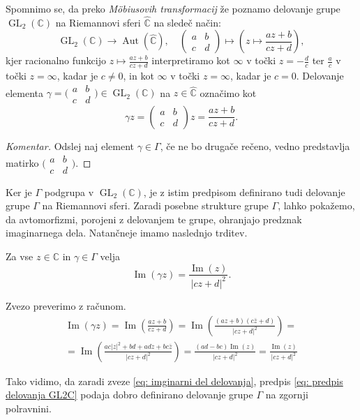 \documentclass[mat1]{fmfdelo}
\numberwithin{equation}{section}
\newcommand{\C}{\mathbb C}
\newcommand{\RS}{\widehat{\C}}
\newcommand{\SL}{\Gamma}
\newcommand{\abcd}{\big(\begin{smallmatrix} a & b\\c & d \end{smallmatrix}\big)}
\newcommand{\pabcd}{\begin{pmatrix} a & b \\ c & d \end{pmatrix}}
\newcommand{\abs}[1]{\left\lvert #1 \right\rvert}
\renewcommand\Im{\operatorname{Im}}%
\DeclareMathOperator{\GL}{GL}
\DeclareMathOperator{\Aut}{Aut}
\theoremstyle{definition}
\newenvironment{komentar}[1][Komentar]{\begin{proof}[#1]\let\qed\relax}{\end{proof}}
\begin{document}
Spomnimo se, da preko \emph{Möbiusovih transformacij} že poznamo delovanje grupe $\GL_2(\C)$ na Riemannovi sferi $\RS$ na sledeč način:
\begin{equation}
    \label{eq: delovanje GL2C na CP1}
    \GL_2(\C) \to \Aut(\RS), \quad \pabcd \mapsto \left(z \mapsto \frac{az + b}{cz + d}\right),
\end{equation}
kjer racionalno funkcijo $z\mapsto\frac{az + b}{cz + d}$ interpretiramo kot $\infty$ v točki $z = -\frac{d}{c}$ ter $\frac{a}{c}$ v točki $z = \infty$, kadar je $c \neq 0$, in kot $\infty$ v točki $z = \infty$, kadar je $c = 0$. Delovanje elementa $\gamma = \abcd \in \GL_2(\C)$ na $z \in \RS$ označimo kot
\begin{equation}
    \label{eq: predpis delovanja GL2C}
    \gamma z =  \pabcd z = \frac{az + b}{cz + d}.
\end{equation}
\begin{komentar}
    Odslej naj element $\gamma \in \SL$, če ne bo drugače rečeno, vedno predstavlja matirko $\abcd$.
\end{komentar}
Ker je $\SL$ podgrupa v $\GL_2(\C)$, je z istim predpisom definirano tudi delovanje grupe $\SL$ na Riemannovi sferi. Zaradi posebne strukture grupe $\SL$, lahko pokažemo, da avtomorfizmi, porojeni z delovanjem te grupe, ohranjajo predznak imaginarnega dela. Natančneje imamo naslednjo trditev.

\begin{trditev}
    Za vse $z \in \C$ in $\gamma \in \SL$ velja 
    \begin{equation}
        \label{eq: imginarni del delovanja}
        \Im(\gamma z) = \frac{\Im(z)}{\abs{cz + d}^2}.
    \end{equation} 
\end{trditev} 

\begin{dokaz}
Zvezo preverimo z računom.
\begin{multline*}
    \Im(\gamma z) = 
    \Im\left(\frac{az + b}{cz + d}\right) = 
    \Im\left(\frac{(az + b)(c\bar{z} + d)}{\abs{cz + d}^2}\right) = \\
    = \Im\left(\frac{ac\abs{z}^2 + bd + adz + bc\bar{z}}{\abs{cz + d}^2}\right) = 
    \frac{(ad - bc)\Im(z)}{\abs{cz + d}^2} = \frac{\Im(z)}{\abs{cz + d}^2}
\end{multline*}
\end{dokaz}
\begin{opomba}
    Tako vidimo, da zaradi zveze \eqref{eq: imginarni del delovanja}, predpis \eqref{eq: predpis delovanja GL2C} podaja dobro definirano delovanje grupe $\SL$ na zgornji polravnini.
\end{opomba}
\end{document}
